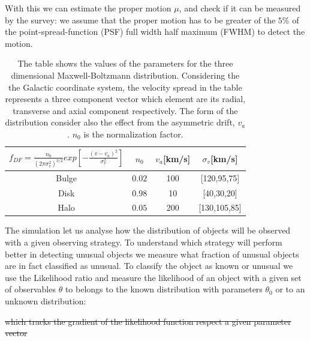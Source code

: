 With this we can estimate the proper motion $\mu$, and check if it can be measured by the survey: we assume that the proper motion has to be greater of the $5\%$ of the point-spread-function (PSF) full width half maximum (FWHM) to detect the motion. 



\begin{table}
\centering
\caption{\label{MB_par}The table shows the values of the parameters for the three dimensional Maxwell-Boltzmann distribution. Considering the the Galactic coordinate system, the velocity spread in the table represents a three component vector which element are its radial, transverse and axial component respectively. The form of the distribution consider also the effect from the asymmetric drift, $v_a$. $n_0$ is the normalization factor.}
\begin{tabular}{|c|c|c|c|}\hline
$f_{DF}=\frac{n_0}{(2\pi \sigma_v^2)^{3/2}}exp[-\frac{(v-v_a)^2}{\sigma_v^2}]$& $n_0$ &$v_a$[km/s] &$\sigma_v $[km/s]  \\\hline \hline
 Bulge & $0.02$ &100 & [120,95,75]  \\ \hline
 Disk & $0.98$ &10 & [40,30,20] \\ \hline
 Halo & $0.05$ &200 & [130,105,85]\\ \hline
\end{tabular}
\end{table}

The simulation let us analyse how the distribution of objects  will be observed with a given observing strategy. To understand which strategy will perform better in detecting unusual objects we measure what  fraction of unusual objects are in fact classified as unusual. To classify the object as known or unusual we use the Likelihood ratio and measure the likelihood of an object with a given set of observables  $\theta$ to belongs to the known distribution with parameters $\theta_0$ or to an unknown distribution:

\sout{which tracks the gradient of the likelihood function respect a given parameter vector }

